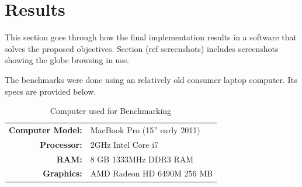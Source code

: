 \chapter{Results}
This section goes through how the final implementation results in a software that solves the proposed objectives. Section (ref screenshots) includes screenshots showing the globe browsing in use.

The benchmarks were done using an relatively old consumer laptop computer. Its specs are provided below.

\begin{table}[h]
  \centering
  \caption[]{Computer used for Benchmarking}
    \label{table:benchmark host}
  \begin{tabular}{| r l |}
    \hline
      \textbf{Computer Model:}  & MacBook Pro (15'' early 2011) \\
      \textbf{Processor:}       & 2GHz Intel Core i7 \\
      \textbf{RAM:}             & 8 GB 1333MHz DDR3 RAM \\
      \textbf{Graphics:}        & AMD Radeon HD 6490M 256 MB \\
    \hline
  \end{tabular}
\end{table}

\clearpage
